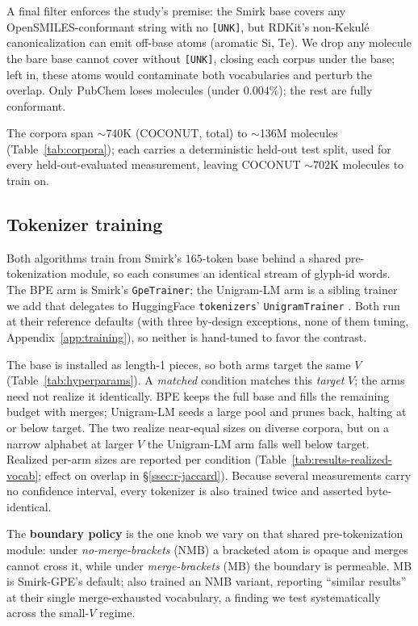 \documentclass{article}
\begin{document}


A final filter enforces the study's premise: the Smirk base covers any
OpenSMILES-conformant string with no \texttt{[UNK]}, but RDKit's non-Kekul\'e
canonicalization can emit off-base atoms (aromatic Si, Te). We drop any molecule
the bare base cannot cover without \texttt{[UNK]}, closing each corpus under the
base; left in, these atoms would contaminate both vocabularies and perturb the
overlap. Only PubChem loses molecules (under $0.004\%$); the rest are fully conformant.

The corpora span $\sim$740K (COCONUT, total) to $\sim$136M molecules
(Table~\ref{tab:corpora});
each carries a deterministic held-out test split, used
for every held-out-evaluated measurement, leaving COCONUT $\sim$702K molecules
to train on.

\subsection{Tokenizer training}\label{ssec:training}

Both algorithms train from Smirk's $165$-token base behind a shared
pre-tokenization module, so each consumes an identical stream of glyph-id words.
The BPE arm is Smirk's \texttt{GpeTrainer}; the Unigram-LM arm is a sibling
trainer we add that delegates to HuggingFace \texttt{tokenizers}'
\texttt{UnigramTrainer} \citep{kudo2018subword-reg, moi2023tokenizers}. Both run at their reference
defaults (with three by-design exceptions, none of them tuning,
Appendix~\ref{app:training}), so neither is hand-tuned to favor the contrast.

The base is installed as length-1 pieces, so both arms target the same $V$
(Table~\ref{tab:hyperparams}). A
\emph{matched} condition matches this \emph{target} $V$; the arms need not
realize it identically. BPE keeps the full base and fills the remaining budget
with merges; Unigram-LM seeds a large pool and prunes back, halting at or below
target. The two realize near-equal sizes on diverse corpora, but on a narrow alphabet at
larger $V$ the Unigram-LM arm falls well below target. Realized per-arm sizes are
reported per condition (Table~\ref{tab:results-realized-vocab}; effect on overlap
in \S\ref{ssec:r-jaccard}). Because
several measurements carry no confidence interval, every tokenizer is also
trained twice and asserted byte-identical.

The \textbf{boundary policy} is the one knob we vary on that shared
pre-tokenization module: under
\emph{no-merge-brackets} (NMB) a bracketed atom is opaque and merges cannot cross
it, while under \emph{merge-brackets} (MB) the boundary is permeable. MB is Smirk-GPE's default; \citet{wadell2026smirk} also
trained an NMB variant, reporting ``similar results'' at their single
merge-exhausted vocabulary, a finding we test systematically across the
small-$V$ regime.
\end{document}

